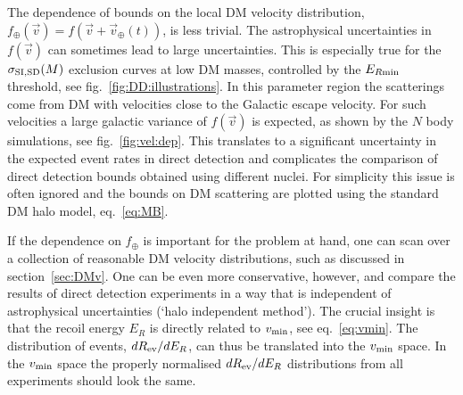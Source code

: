 The dependence of bounds on the local DM velocity distribution, $f_{\oplus}(\vec v)= f(\vec v+\vec v_\oplus(t))$, is less trivial. The astrophysical uncertainties in $f(\vec v)$ can sometimes lead to large uncertainties. 
This is especially true for the $\sigma_{\rm SI, SD}(M)$ exclusion curves at low DM masses, controlled by the $E_{R\rm min}$ threshold, see fig.~\ref{fig:DD:illustrations}.   
In this parameter region the  scatterings come from DM with velocities close to the Galactic escape velocity. 
For such velocities a large galactic variance of $f(\vec v)$ is expected, as shown by the $N$ body simulations, see fig.~\ref{fig:vel:dep}. This translates to a significant uncertainty in the expected event rates in direct detection and complicates the comparison of direct detection bounds obtained using different nuclei.
For simplicity this issue is often ignored and the bounds on DM scattering are plotted using the standard DM halo model, eq.~\eqref{eq:MB}.

\smallskip


If the dependence on $f_{\oplus}$ is important for the problem at hand, one can scan over a collection of reasonable  DM velocity distributions, such as discussed in section~\ref{sec:DMv}.
One can be even more conservative, however, and compare the results of direct detection experiments 
in a way that is independent of astrophysical uncertainties (`halo independent method'). The crucial insight is that the recoil energy $E_R$ is directly related to $v_{\rm min}$, see eq.~\eqref{eq:vmin}. The distribution of events, $d R_{\rm ev}/dE_R$, can thus be translated into the $v_{\rm min}$ space. In the $v_{\rm min}$ space the properly normalised $d R_{\rm ev}/dE_R$ distributions from all experiments should look the same. 


